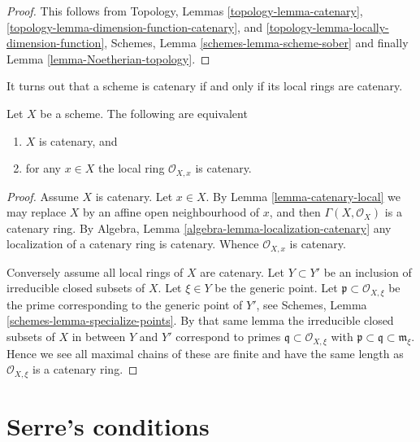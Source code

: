 \begin{proof}
This follows from
Topology, Lemmas
\ref{topology-lemma-catenary},
\ref{topology-lemma-dimension-function-catenary}, and
\ref{topology-lemma-locally-dimension-function},
Schemes, Lemma \ref{schemes-lemma-scheme-sober}
and finally Lemma \ref{lemma-Noetherian-topology}.
\end{proof}

\noindent
It turns out that a scheme is catenary if and only if its local
rings are catenary.

\begin{lemma}
\label{lemma-catenary-local-rings-catenary}
Let $X$ be a scheme. The following are equivalent
\begin{enumerate}
\item $X$ is catenary, and
\item for any $x \in X$ the local ring $\mathcal{O}_{X, x}$ is
catenary.
\end{enumerate}
\end{lemma}

\begin{proof}
Assume $X$ is catenary. Let $x \in X$. By Lemma \ref{lemma-catenary-local}
we may replace $X$ by an affine open neighbourhood of $x$, and
then $\Gamma(X, \mathcal{O}_X)$ is a catenary ring. By
Algebra, Lemma \ref{algebra-lemma-localization-catenary} any
localization of a catenary ring is
catenary. Whence $\mathcal{O}_{X, x}$ is catenary.

\medskip\noindent
Conversely assume all local rings of $X$ are catenary.
Let $Y \subset Y'$ be an inclusion of irreducible closed
subsets of $X$. Let $\xi \in Y$ be the generic point.
Let $\mathfrak p \subset \mathcal{O}_{X, \xi}$ be the prime
corresponding to the generic point of $Y'$, see
Schemes, Lemma \ref{schemes-lemma-specialize-points}. By that same
lemma the irreducible closed subsets of $X$ in between $Y$ and $Y'$
correspond to primes $\mathfrak q \subset \mathcal{O}_{X, \xi}$
with $\mathfrak p \subset \mathfrak q \subset \mathfrak m_{\xi}$.
Hence we see all maximal chains of these are finite and have the
same length as $\mathcal{O}_{X, \xi}$ is a catenary ring.
\end{proof}






\section{Serre's conditions}
\label{section-Rk}

